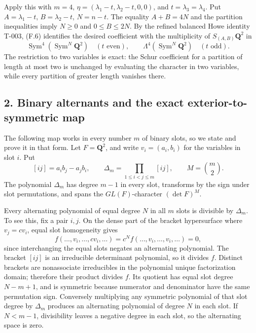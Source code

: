 \documentclass[
  10pt,
]{article}
\begin{document}
Apply this with \(m=4\), \(\eta=(\lambda_1-t,\lambda_2-t,0,0)\), and
\(t=\lambda_3=\lambda_4\). Put \(A=\lambda_1-t\), \(B=\lambda_2-t\),
\(N=n-t\). The equality \(A+B=4N\) and the partition inequalities imply
\(N\ge0\) and \(0\le B\le2N\). By the refined balanced Howe identity
T-003, (F.6) identifies the desired coefficient with the multiplicity of
\(S_{(A,B)}\mathbf Q^2\) in \[
\operatorname{Sym}^4(\operatorname{Sym}^N\mathbf Q^2)
\quad(t\text{ even}),\qquad
\Lambda^4(\operatorname{Sym}^N\mathbf Q^2)
\quad(t\text{ odd}).
\tag{F.7}
\] The restriction to two variables is exact: the Schur coefficient for
a partition of length at most two is unchanged by evaluating the
character in two variables, while every partition of greater length
vanishes there.

\subsection{2. Binary alternants and the exact exterior-to-symmetric
map}\label{binary-alternants-and-the-exact-exterior-to-symmetric-map}

The following map works in every number \(m\) of binary slots, so we
state and prove it in that form. Let \(F=\mathbf Q^2\), and write
\(v_i=(a_i,b_i)\) for the variables in slot \(i\). Put \[
[ij]=a_i b_j-a_j b_i,\qquad
\Delta_m=\prod_{1\le i<j\le m}[ij],\qquad
M=\binom m2.
\tag{F.8}
\] The polynomial \(\Delta_m\) has degree \(m-1\) in every slot,
transforms by the sign under slot permutations, and spans the
\(GL(F)\)-character \((\det F)^M\).

Every alternating polynomial of equal degree \(N\) in all \(m\) slots is
divisible by \(\Delta_m\). To see this, fix a pair \(i,j\). On the dense
part of the bracket hypersurface where \(v_j=c v_i\), equal slot
homogeneity gives \[
f(\ldots,v_i,\ldots,c v_i,\ldots)
=c^N f(\ldots,v_i,\ldots,v_i,\ldots)=0,
\] since interchanging the equal slots negates an alternating
polynomial. The bracket \([ij]\) is an irreducible determinant
polynomial, so it divides \(f\). Distinct brackets are nonassociate
irreducibles in the polynomial unique factorization domain; therefore
their product divides \(f\). Its quotient has equal slot degree
\(N-m+1\), and is symmetric because numerator and denominator have the
same permutation sign. Conversely multiplying any symmetric polynomial
of that slot degree by \(\Delta_m\) produces an alternating polynomial
of degree \(N\) in each slot. If \(N<m-1\), divisibility leaves a
negative degree in each slot, so the alternating space is zero.
\end{document}
